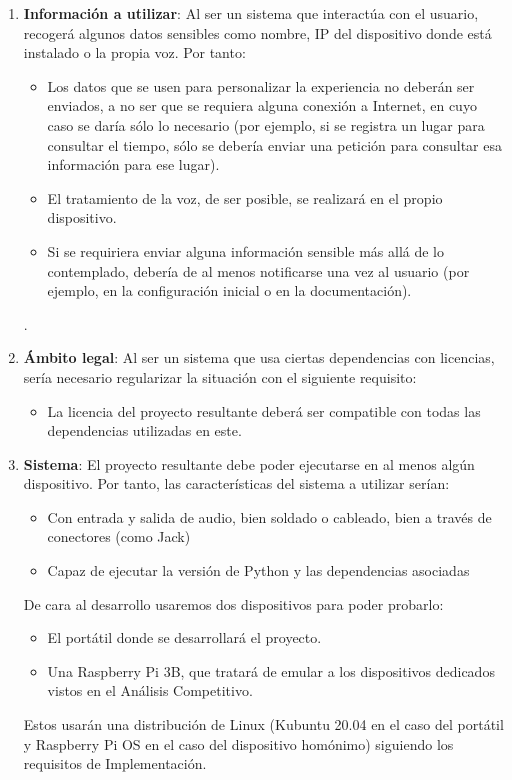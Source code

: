 \begin{enumerate}
	\item \textbf{Información a utilizar}: Al ser un sistema que interactúa con el usuario, recogerá algunos datos sensibles como nombre, IP del dispositivo donde está instalado o la propia voz. Por tanto:
	\begin{itemize}
		\item Los datos que se usen para personalizar la experiencia no deberán ser enviados, a no ser que se requiera alguna conexión a Internet, en cuyo caso se daría sólo lo necesario (por ejemplo, si se registra un lugar para consultar el tiempo, sólo se debería enviar una petición para consultar esa información para ese lugar).
		\item El tratamiento de la voz, de ser posible, se realizará en el propio dispositivo.
		\item Si se requiriera enviar alguna información sensible más allá de lo contemplado, debería de al menos notificarse una vez al usuario (por ejemplo, en la configuración inicial o en la documentación).
	\end{itemize}
.
	\item \textbf{Ámbito legal}: Al ser un sistema que usa ciertas dependencias con licencias, sería necesario regularizar la situación con el siguiente requisito:
	\begin{itemize}
		\item La licencia del proyecto resultante deberá ser compatible con todas las dependencias utilizadas en este.
	\end{itemize}

	\item \textbf{Sistema}: El proyecto resultante debe poder ejecutarse en al menos algún dispositivo. Por tanto, las características del sistema a utilizar serían:
	\begin{itemize}
		\item Con entrada y salida de audio, bien soldado o cableado, bien a través de conectores (como Jack)
		\item Capaz de ejecutar la versión de Python y las dependencias asociadas
	\end{itemize}

	De cara al desarrollo usaremos dos dispositivos para poder probarlo:
	\begin{itemize}
		\item El portátil donde se desarrollará el proyecto.
		\item Una Raspberry Pi 3B, que tratará de emular a los dispositivos dedicados vistos en el Análisis Competitivo.
	\end{itemize}
	Estos usarán una distribución de Linux (Kubuntu 20.04 en el caso del portátil y Raspberry Pi OS en el caso del dispositivo homónimo) siguiendo los requisitos de Implementación.
\end{enumerate}
 